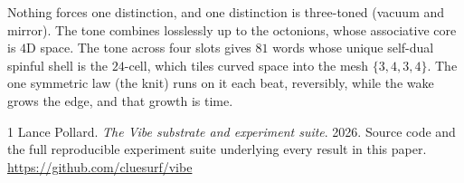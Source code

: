 \documentclass{article}
\begin{document}
Nothing forces one distinction, and one distinction is three-toned (vacuum and mirror). The tone
combines losslessly up to the octonions, whose associative core is $4$D space. The tone across
four slots gives $81$ words whose unique self-dual spinful shell is the $24$-cell, which tiles
curved space into the mesh $\{3,4,3,4\}$. The one symmetric law (the knit) runs on it each beat,
reversibly, while the wake grows the edge, and that growth is time.

\begin{thebibliography}{1}
Lance Pollard. \emph{The Vibe substrate and experiment suite}. 2026.
Source code and the full reproducible experiment suite underlying every result in this paper.
\url{https://github.com/cluesurf/vibe}
\end{thebibliography}
\end{document}
